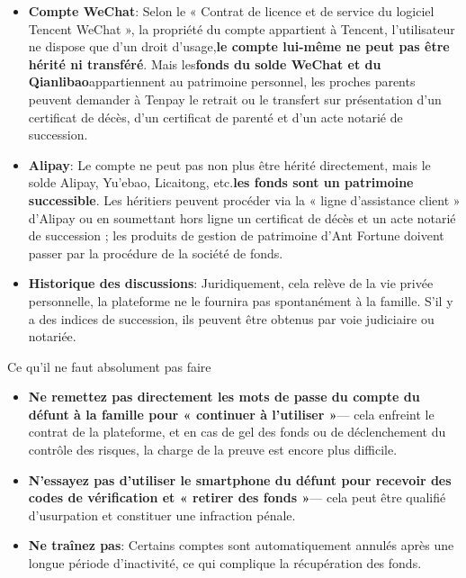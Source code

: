 \begin{itemize}
  \item \textbf{Compte WeChat}: Selon le « Contrat de licence et de service du logiciel Tencent WeChat », la propriété du compte appartient à Tencent, l'utilisateur ne dispose que d'un droit d'usage,\textbf{le compte lui-même ne peut pas être hérité ni transféré}. Mais les\textbf{fonds du solde WeChat et du Qianlibao}appartiennent au patrimoine personnel, les proches parents peuvent demander à Tenpay le retrait ou le transfert sur présentation d'un certificat de décès, d'un certificat de parenté et d'un acte notarié de succession.
  \item \textbf{Alipay}: Le compte ne peut pas non plus être hérité directement, mais le solde Alipay, Yu'ebao, Licaitong, etc.\textbf{les fonds sont un patrimoine successible}. Les héritiers peuvent procéder via la « ligne d'assistance client » d'Alipay ou en soumettant hors ligne un certificat de décès et un acte notarié de succession ; les produits de gestion de patrimoine d'Ant Fortune doivent passer par la procédure de la société de fonds.
  \item \textbf{Historique des discussions}: Juridiquement, cela relève de la vie privée personnelle, la plateforme ne le fournira pas spontanément à la famille. S'il y a des indices de succession, ils peuvent être obtenus par voie judiciaire ou notariée.
\end{itemize}

\begin{tcbwarn}{Ce qu'il ne faut absolument pas faire}
\begin{itemize}
  \item \textbf{Ne remettez pas directement les mots de passe du compte du défunt à la famille pour « continuer à l'utiliser »}— cela enfreint le contrat de la plateforme, et en cas de gel des fonds ou de déclenchement du contrôle des risques, la charge de la preuve est encore plus difficile.
  \item \textbf{N'essayez pas d'utiliser le smartphone du défunt pour recevoir des codes de vérification et « retirer des fonds »}— cela peut être qualifié d'usurpation et constituer une infraction pénale.
  \item \textbf{Ne traînez pas}: Certains comptes sont automatiquement annulés après une longue période d'inactivité, ce qui complique la récupération des fonds.
\end{itemize}

\end{tcbwarn}

